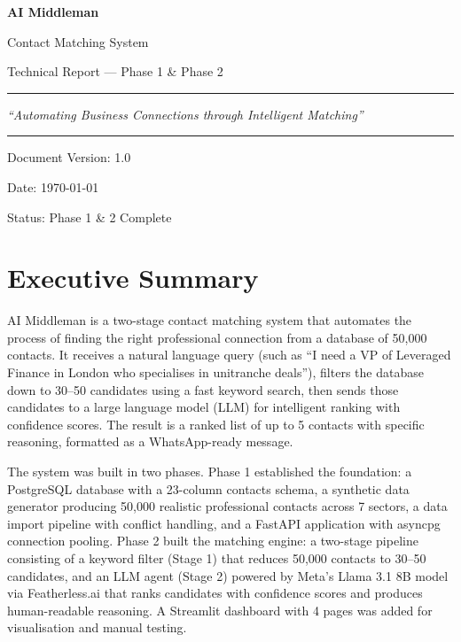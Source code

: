 \documentclass[12pt, a4paper]{report}
\begin{document}
\begin{titlepage}
    \centering
    \vspace*{2cm}
    {\Huge\bfseries AI Middleman\par}
    \vspace{0.5cm}
    {\Large Contact Matching System\par}
    \vspace{0.5cm}
    {\large Technical Report --- Phase 1 \& Phase 2\par}
    \vspace{2cm}
    \rule{\textwidth}{0.5pt}
    \vspace{1cm}
    {\large\itshape ``Automating Business Connections through Intelligent Matching''\par}
    \vspace{1cm}
    \rule{\textwidth}{0.5pt}
    \vspace{2cm}
    {\large Document Version: 1.0\par}
    \vspace{0.3cm}
    {\large Date: \today\par}
    \vspace{0.3cm}
    {\large Status: Phase 1 \& 2 Complete\par}
    \vspace{3cm}
\end{titlepage}

\tableofcontents
\newpage

\chapter{Executive Summary}

AI Middleman is a two-stage contact matching system that automates the process of finding the right professional connection from a database of 50,000 contacts. It receives a natural language query (such as ``I need a VP of Leveraged Finance in London who specialises in unitranche deals''), filters the database down to 30--50 candidates using a fast keyword search, then sends those candidates to a large language model (LLM) for intelligent ranking with confidence scores. The result is a ranked list of up to 5 contacts with specific reasoning, formatted as a WhatsApp-ready message.

The system was built in two phases. Phase 1 established the foundation: a PostgreSQL database with a 23-column contacts schema, a synthetic data generator producing 50,000 realistic professional contacts across 7 sectors, a data import pipeline with conflict handling, and a FastAPI application with asyncpg connection pooling. Phase 2 built the matching engine: a two-stage pipeline consisting of a keyword filter (Stage 1) that reduces 50,000 contacts to 30--50 candidates, and an LLM agent (Stage 2) powered by Meta's Llama 3.1 8B model via Featherless.ai that ranks candidates with confidence scores and produces human-readable reasoning. A Streamlit dashboard with 4 pages was added for visualisation and manual testing.
\end{document}
